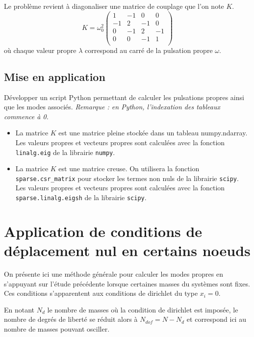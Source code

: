 \documentclass[a4paper, 12pt]{article}
\begin{document}
Le problème revient à diagonaliser une matrice de couplage que l'on note $K$. 
$$
K=
{\omega_0^2}
\left(
\begin{array}{rrrr}
1   & -1 & 0  & 0  \\
-1  & 2 & -1 & 0 \\
0  & -1 & 2 & -1 \\
0  & 0 & -1 & 1 \\
\end{array}
\right)
$$
où chaque valeur propre  $\lambda$ correspond au carré de la pulsation propre ${\omega}$.

\subsection{Mise en application}

Développer un script Python permettant de calculer les pulsations propres ainsi que les modes associés.
{\it Remarque : en Python, l’indexation des tableaux commence à 0.}

\begin{itemize}
\item La matrice $K$ est une matrice pleine stockée dans un tableau numpy.ndarray.
Les valeurs propres et vecteurs propres sont calculées avec la fonction {\tt linalg.eig} de la librairie {\tt numpy}.
\item La matrice $K$ est une matrice creuse.
On utilisera la fonction {\tt sparse.csr\_matrix} pour stocker les termes non nuls de la
librairie {\tt scipy}.
Les valeurs propres et vecteurs propres sont calculées avec la fonction {\tt sparse.linalg.eigsh} de la librairie {\tt scipy}.
\end{itemize}



\section{Application de conditions de déplacement nul en certains noeuds}

On présente ici une méthode générale pour calculer les modes propres en s'appuyant sur
l'étude précédente lorsque certaines masses du systèmes sont fixes.
Ces conditions s'apparentent aux conditions de dirichlet du type $x_i=0$.

En notant $N_d$ le nombre de masses où  la condition de dirichlet est imposée, 
le nombre de degrés de liberté se réduit alors à $N_{dof}=N-N_d$ et correspond 
ici au nombre de masses pouvant osciller.\\
\end{document}
